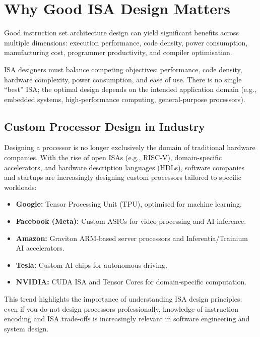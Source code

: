 \documentclass[11pt, a4paper, notitlepage]{report}
\theoremstyle{definition}
\theoremstyle{remark}
\theoremstyle{definition}
\begin{document}
\section{Why Good ISA Design Matters}

Good instruction set architecture design can yield significant benefits across multiple dimensions: execution performance, code density, power consumption, manufacturing cost, programmer productivity, and compiler optimisation.

\begin{keyresult}[title={ISA Design is a Multi-Objective Optimisation Problem}]
ISA designers must balance competing objectives: performance, code density, hardware complexity, power consumption, and ease of use. There is no single ``best'' ISA; the optimal design depends on the intended application domain (e.g., embedded systems, high-performance computing, general-purpose processors).
\end{keyresult}

\subsection{Custom Processor Design in Industry}

Designing a processor is no longer exclusively the domain of traditional hardware companies. With the rise of open ISAs (e.g., RISC-V), domain-specific accelerators, and hardware description languages (HDLs), software companies and startups are increasingly designing custom processors tailored to specific workloads:

\begin{itemize}
  \item \textbf{Google:} Tensor Processing Unit (TPU), optimised for machine learning.
  \item \textbf{Facebook (Meta):} Custom ASICs for video processing and AI inference.
  \item \textbf{Amazon:} Graviton ARM-based server processors and Inferentia/Trainium AI accelerators.
  \item \textbf{Tesla:} Custom AI chips for autonomous driving.
  \item \textbf{NVIDIA:} CUDA ISA and Tensor Cores for domain-specific computation.
\end{itemize}

This trend highlights the importance of understanding ISA design principles: even if you do not design processors professionally, knowledge of instruction encoding and ISA trade-offs is increasingly relevant in software engineering and system design.
\end{document}
